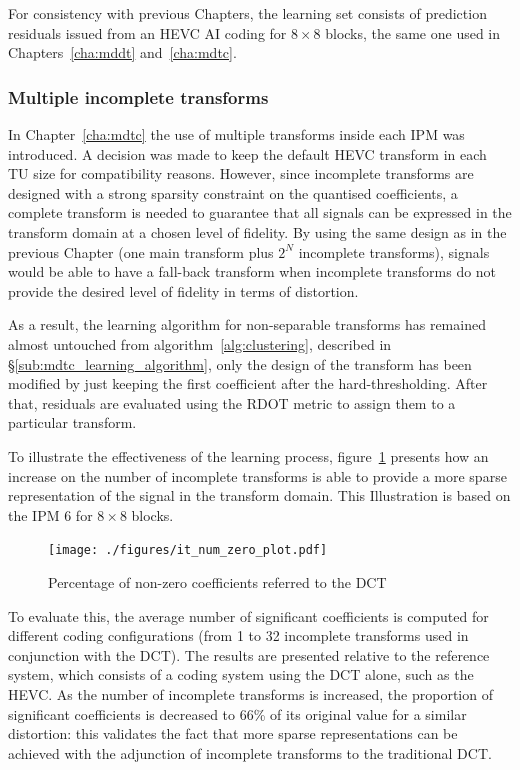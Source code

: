 \documentclass[11pt,a4paper,openright,twoside]{book}
\numberwithin{equation}{section} %
\numberwithin{figure}{section} %
\numberwithin{table}{section} %
\begin{document}
For consistency with previous Chapters, the learning set consists of
prediction residuals issued from an \ac{HEVC} \ac{AI} coding for $8\times8$
blocks, the same one used in Chapters~\ref{cha:mddt} and~\ref{cha:mdtc}.

\subsubsection{Multiple incomplete transforms}
\label{ssub:it_multiple_incomplete_transforms}

In Chapter~\ref{cha:mdtc} the use of multiple transforms inside each \ac{IPM}
was introduced.
A decision was made to keep the default \ac{HEVC} transform in each \ac{TU}
size for compatibility reasons.
However, since incomplete transforms are designed with a strong sparsity
constraint on the quantised coefficients, a complete transform is needed to
guarantee that all signals can be expressed in the transform domain at a
chosen level of fidelity.
By using the same design as in the previous Chapter (one main transform plus
$2^N$ incomplete transforms), signals would be able to have a fall-back
transform when incomplete transforms do not provide the desired level of
fidelity in terms of distortion.

As a result, the learning algorithm for non-separable transforms has remained
almost untouched from algorithm~\ref{alg:clustering}, described in
\S\ref{sub:mdtc_learning_algorithm}, only the design of the transform has been
modified by just keeping the first coefficient after the hard-thresholding.
After that, residuals are evaluated using the \ac{RDOT} metric to assign them
to a particular transform.

To illustrate the effectiveness of the learning process,
figure~\ref{fig:it_num_zero} presents how an increase on the number of
incomplete transforms is able to provide a more sparse representation of
the signal in the transform domain.
This Illustration is based on the \ac{IPM} 6 for $8\times8$ blocks.

\begin{figure}[tp]
	\centering
	\texttt{[image: ./figures/it\_num\_zero\_plot.pdf]}
	\caption{Percentage of non-zero coefficients referred to the \acs{DCT}}
	\label{fig:it_num_zero}
\end{figure}

To evaluate this, the average number of significant coefficients is computed
for different coding configurations (from 1 to 32 incomplete transforms used
in conjunction with the \ac{DCT}).
The results are presented relative to the reference system, which consists of
a coding system using the \ac{DCT} alone, such as the \ac{HEVC}.
As the number of incomplete transforms is increased, the proportion of
significant coefficients is decreased to 66\% of its original value for a
similar distortion:
this validates the fact that more sparse representations can be achieved with
the adjunction of incomplete transforms to the traditional \ac{DCT}.
\end{document}
